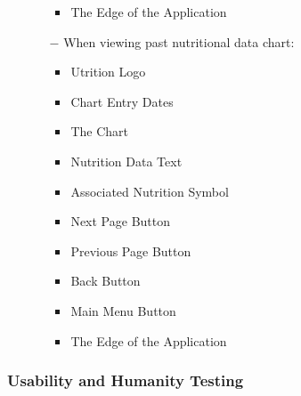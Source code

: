 \documentclass[12pt, titlepage]{article}
\begin{document}
\begin{enumerate}
\begin{enumerate}
\begin{itemize}
				\item The Edge of the Application
			\end{itemize}
			\item[$-$] When viewing past nutritional data chart:
			\begin{itemize}
				\item Utrition Logo
				\item Chart Entry Dates
				\item The Chart
				\item Nutrition Data Text
				\item Associated Nutrition Symbol
				\item Next Page Button
				\item Previous Page Button
				\item Back Button
				\item Main Menu Button
				\item The Edge of the Application	
			\end{itemize}
			
		\end{enumerate}
		
	\end{enumerate}
	
	\subsubsection{Usability and Humanity Testing}
	
	
\end{document}
